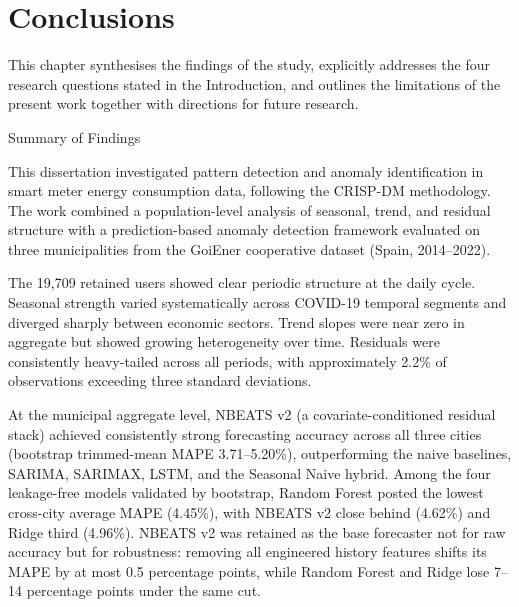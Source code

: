 ﻿\documentclass[12pt,reqno, twoside]{amsbook}
\makeatletter
\numberwithin{figure}{chapter}
\numberwithin{table}{chapter}
\numberwithin{equation}{chapter}
\def\section{\@startsection{section}{1}%
      \z@{.5\linespacing\@plus.7\linespacing}{.25\linespacing}%
      {\normalfont\bfseries\flushleft}}
\theoremstyle{plain}
\numberwithin{equation}{chapter}
\numberwithin{section}{chapter}
\makeatother
\begin{document}
\FloatBarrier



\chapter{Conclusions}
\label{chapter:conclusions}

This chapter synthesises the findings of the study, explicitly addresses the four research questions stated in the Introduction, and outlines the limitations of the present work together with directions for future research.

\section{Summary of Findings}

This dissertation investigated pattern detection and anomaly identification in smart meter energy consumption data, following the \ac{CRISP-DM} methodology. The work combined a population-level analysis of seasonal, trend, and residual structure with a prediction-based anomaly detection framework evaluated on three municipalities from the GoiEner cooperative dataset (Spain, 2014--2022).

The 19,709 retained users showed clear periodic structure at the daily cycle. Seasonal strength varied systematically across COVID-19 temporal segments and diverged sharply between economic sectors. Trend slopes were near zero in aggregate but showed growing heterogeneity over time. Residuals were consistently heavy-tailed across all periods, with approximately 2.2\% of observations exceeding three standard deviations.

At the municipal aggregate level, \ac{NBEATS} v2 (a covariate-conditioned residual stack) achieved consistently strong forecasting accuracy across all three cities (bootstrap trimmed-mean \ac{MAPE} 3.71--5.20\%), outperforming the naive baselines, \ac{SARIMA}, \ac{SARIMAX}, \ac{LSTM}, and the Seasonal Naive hybrid. Among the four leakage-free models validated by bootstrap, Random Forest posted the lowest cross-city average \ac{MAPE} (4.45\%), with \ac{NBEATS} v2 close behind (4.62\%) and Ridge third (4.96\%). \ac{NBEATS} v2 was retained as the base forecaster not for raw accuracy but for robustness: removing all engineered history features shifts its \ac{MAPE} by at most 0.5 percentage points, while Random Forest and Ridge lose 7--14 percentage points under the same cut.
\end{document}
